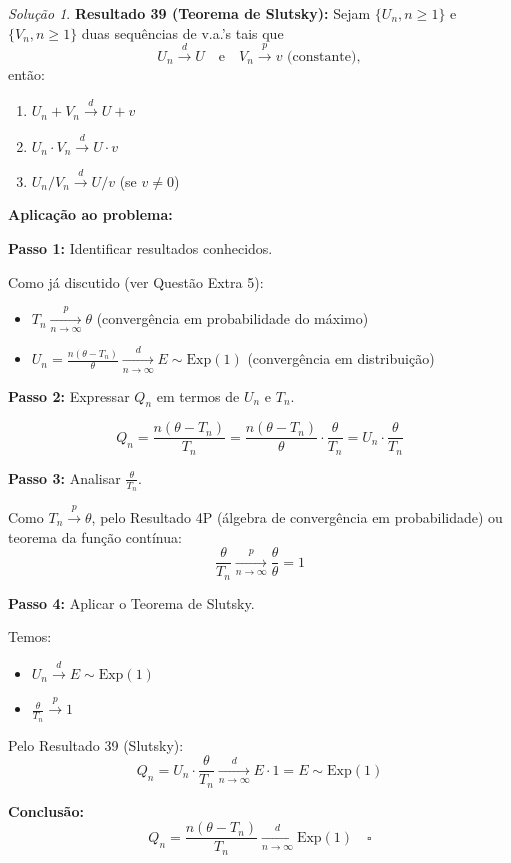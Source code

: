 \documentclass[12pt,a4paper]{article}
\theoremstyle{definition}
\theoremstyle{remark}
\newtheorem{solucao}{Solução}[section]
\begin{document}
\begin{solucao}
\textbf{Resultado 39 (Teorema de Slutsky):} Sejam $\{U_n, n \geq 1\}$ e $\{V_n, n \geq 1\}$ duas sequências de v.a.'s tais que 
\[
U_n \xrightarrow{d} U \quad \text{e} \quad V_n \xrightarrow{p} v \text{ (constante)},
\]
então:
\begin{enumerate}
    \item $U_n + V_n \xrightarrow{d} U + v$
    \item $U_n \cdot V_n \xrightarrow{d} U \cdot v$
    \item $U_n / V_n \xrightarrow{d} U / v$ (se $v \neq 0$)
\end{enumerate}

\textbf{Aplicação ao problema:}

\textbf{Passo 1:} Identificar resultados conhecidos.

Como já discutido (ver Questão Extra 5):
\begin{itemize}
    \item $T_n \xrightarrow[n \to \infty]{p} \theta$ (convergência em probabilidade do máximo)
    \item $U_n = \frac{n(\theta - T_n)}{\theta} \xrightarrow[n \to \infty]{d} E \sim \text{Exp}(1)$ (convergência em distribuição)
\end{itemize}

\textbf{Passo 2:} Expressar $Q_n$ em termos de $U_n$ e $T_n$.

\[
Q_n = \frac{n(\theta - T_n)}{T_n} = \frac{n(\theta - T_n)}{\theta} \cdot \frac{\theta}{T_n} = U_n \cdot \frac{\theta}{T_n}
\]

\textbf{Passo 3:} Analisar $\frac{\theta}{T_n}$.

Como $T_n \xrightarrow{p} \theta$, pelo Resultado 4P (álgebra de convergência em probabilidade) ou teorema da função contínua:
\[
\frac{\theta}{T_n} \xrightarrow[n \to \infty]{p} \frac{\theta}{\theta} = 1
\]

\textbf{Passo 4:} Aplicar o Teorema de Slutsky.

Temos:
\begin{itemize}
    \item $U_n \xrightarrow{d} E \sim \text{Exp}(1)$
    \item $\frac{\theta}{T_n} \xrightarrow{p} 1$
\end{itemize}

Pelo Resultado 39 (Slutsky):
\[
Q_n = U_n \cdot \frac{\theta}{T_n} \xrightarrow[n \to \infty]{d} E \cdot 1 = E \sim \text{Exp}(1)
\]

\textbf{Conclusão:}
\[
Q_n = \frac{n(\theta - T_n)}{T_n} \xrightarrow[n \to \infty]{d} \text{Exp}(1) \quad \square
\]
\end{solucao}
\end{document}
